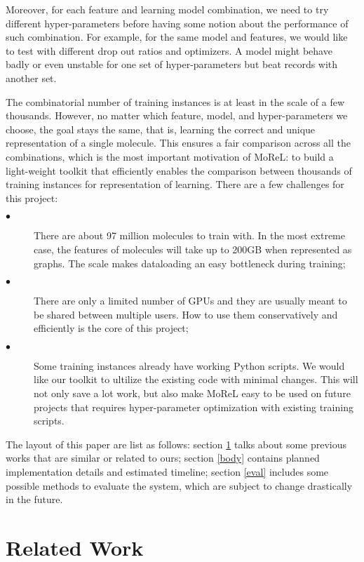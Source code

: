 \documentclass[10pt,twocolumn]{article}
\begin{document}
Moreover, for each feature and learning model combination, we need to try different hyper-parameters before having some notion about the performance of such combination. 
For example, for the same model and features, we would like to test with different drop out ratios and optimizers.
A model might behave badly or even unstable for one set of hyper-parameters but beat records with another set. 

The combinatorial number of training instances is at least in the scale of a few thousands. 
However, no matter which feature, model, and hyper-parameters we choose, the goal stays the same, that is, learning the correct and unique representation of a single molecule. 
This ensures a fair comparison across all the combinations, which is the most important motivation of MoReL: to build a light-weight toolkit that efficiently enables the comparison between thousands of training instances for representation of learning. 
There are a few challenges for this project:
\begin{description}
	\item[$\bullet$]  There are about 97 million molecules to train with. In the most extreme case, the features of molecules will take up to 200GB when represented as graphs. The scale makes dataloading an easy bottleneck during training;
	\item[$\bullet$]  There are only a limited number of GPUs and they are usually meant to be shared between multiple users. How to use them conservatively and efficiently is the core of this project; 
	\item[$\bullet$]  Some training instances already have working Python scripts. We would like our toolkit to ultilize the existing code with minimal changes. This will not only save a lot work, but also make MoReL easy to be used on future projects that requires hyper-parameter optimization with existing training scripts. 
\end{description}

The layout of this paper are list as follows: 
section \ref{prep} talks about some previous works that are similar or related to ours; 
section \ref{body} contains planned implementation details and estimated timeline; 
section \ref{eval} includes some possible methods to evaluate the system, which are subject to change drastically in the future. 

\section{Related Work} \label{prep}
\end{document}
